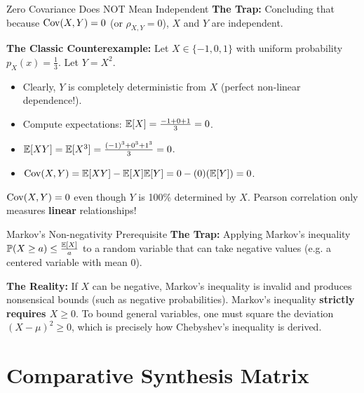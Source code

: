 \begin{trapbox}{Zero Covariance Does NOT Mean Independent}
\textbf{The Trap:} Concluding that because $\operatorname{Cov}(X, Y) = 0$ (or $\rho_{X,Y} = 0$), $X$ and $Y$ are independent.

\textbf{The Classic Counterexample:}
Let $X \in \{-1, 0, 1\}$ with uniform probability $p_X(x) = \frac{1}{3}$. Let $Y = X^2$.
\begin{itemize}
    \item Clearly, $Y$ is completely deterministic from $X$ (perfect non-linear dependence!).
    \item Compute expectations: $\mathbb{E}[X] = \frac{-1 + 0 + 1}{3} = 0$.
    \item $\mathbb{E}[XY] = \mathbb{E}[X^3] = \frac{(-1)^3 + 0^3 + 1^3}{3} = 0$.
    \item $\operatorname{Cov}(X, Y) = \mathbb{E}[XY] - \mathbb{E}[X]\mathbb{E}[Y] = 0 - (0)(\mathbb{E}[Y]) = 0$.
\end{itemize}
$\operatorname{Cov}(X, Y) = 0$ even though $Y$ is 100\% determined by $X$. Pearson correlation only measures \textbf{linear} relationships!
\end{trapbox}

\begin{trapbox}{Markov's Non-negativity Prerequisite}
\textbf{The Trap:} Applying Markov's inequality $\mathbb{P}(X \ge a) \le \frac{\mathbb{E}[X]}{a}$ to a random variable that can take negative values (e.g. a centered variable with mean 0).

\textbf{The Reality:} If $X$ can be negative, Markov's inequality is invalid and produces nonsensical bounds (such as negative probabilities). Markov's inequality \textbf{strictly requires $X \ge 0$}. To bound general variables, one must square the deviation $(X - \mu)^2 \ge 0$, which is precisely how Chebyshev's inequality is derived.
\end{trapbox}

\section{Comparative Synthesis Matrix}


